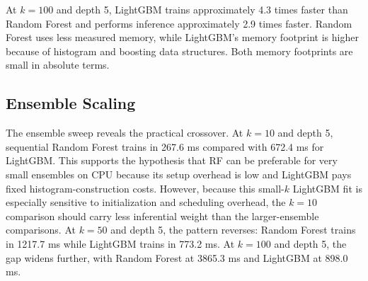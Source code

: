 \documentclass[11pt]{article}
\begin{document}
\begin{table}[ht]
\centering
\caption{Computational and predictive profiling summary for malaria outbreak prediction.}
\label{tab:complexity-summary}
\end{table}

At $k=100$ and depth 5, LightGBM trains approximately 4.3 times faster than Random Forest and performs inference approximately 2.9 times faster. Random Forest uses less measured memory, while LightGBM's memory footprint is higher because of histogram and boosting data structures. Both memory footprints are small in absolute terms.

\subsection{Ensemble Scaling}
The ensemble sweep reveals the practical crossover. At $k=10$ and depth 5, sequential Random Forest trains in 267.6 ms compared with 672.4 ms for LightGBM. This supports the hypothesis that RF can be preferable for very small ensembles on CPU because its setup overhead is low and LightGBM pays fixed histogram-construction costs. However, because this small-$k$ LightGBM fit is especially sensitive to initialization and scheduling overhead, the $k=10$ comparison should carry less inferential weight than the larger-ensemble comparisons. At $k=50$ and depth 5, the pattern reverses: Random Forest trains in 1217.7 ms while LightGBM trains in 773.2 ms. At $k=100$ and depth 5, the gap widens further, with Random Forest at 3865.3 ms and LightGBM at 898.0 ms.
\end{document}
